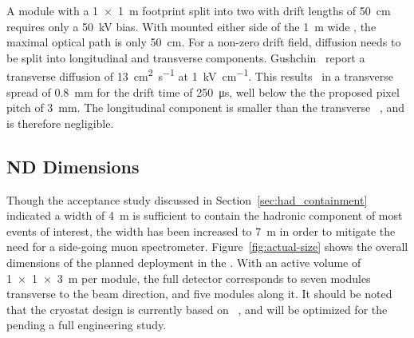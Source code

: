 A module with a \SI{1x1}{\metre} footprint split into two  with drift lengths of \SI{50}{\centi\metre} requires only a \SI{50}{\kilo\volt} bias.
With  mounted either side of the \SI{1}{\metre} wide , the maximal optical path is only \SI{50}{\centi\metre}.
For a non-zero drift field, diffusion needs to be split into longitudinal and transverse components. Gushchin~\cite{gushchin} report a transverse diffusion of \SI{13}{\centi\metre\squared\per\second} at \SI{1}{\kilo\volt\per\centi\metre}.
This results~\cite{lngDet} in a transverse spread of \SI{0.8}{\milli\metre} for the drift time of \SI{250}{\micro\second}, well below the the proposed pixel pitch of \SI{3}{\milli\metre}.
The longitudinal component is smaller than the transverse ~\cite{lngDet},  and is therefore negligible.

\subsection{ND Dimensions}
\label{sec:det_dimensions}

Though the acceptance study discussed in Section~\ref{sec:had_containment} indicated a width of \SI{4}{\metre} is sufficient to contain the hadronic component of most events of interest, the width has been increased to 
\SI{7}{\metre} in order to mitigate the need for a side-going muon spectrometer.
Figure~\ref{fig:actual-size} shows the overall dimensions of the planned  deployment in the   . 
With an active volume of \SI{1x1x3}{\metre} per module, the full  detector corresponds to seven modules transverse to the beam direction, and five modules along it. 
It should be noted that the cryostat design is currently based on ~\cite{Abi:2017aow}, and will be optimized for the   pending a full engineering study.  


